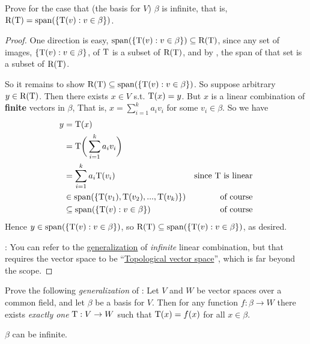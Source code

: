 \begin{exercise} \label{exercise 2.1.34}
Prove  for the case that (the basis for \(V\)) \(\beta\) is infinite,
that is, \(\mathrm{R(T)} = \operatorname{span}(\{ \mathrm{T}(v) : v \in \beta \})\).
\end{exercise}

\begin{proof}
One direction is easy, \(\operatorname{span}(\{ \mathrm{T}(v) : v \in \beta \}) \subseteq \mathrm{R(T)}\), since any set of images, \(\{ \mathrm{T}(v) : v \in \beta \}\), of \(\mathrm{T}\) is a subset of \(\mathrm{R(T)}\), and by , the span of that set is a subset of \(\mathrm{R(T)}\).

So it remains to show \(\mathrm{R(T)} \subseteq \operatorname{span}(\{ \mathrm{T}(v) : v \in \beta \})\).
So suppose arbitrary \(y \in \mathrm{R(T)}\).
Then there exists \(x \in V\) s.t. \(\mathrm{T}(x) = y\).
But \(x\) is a linear combination of \textbf{finite}\RED{*} vectors in \(\beta\),
That is, \(x = \sum_{i = 1}^k a_i v_i\) for some \(v_i \in \beta\).
So we have
\begin{align*}
    y & = \mathrm{T}(x) \\
      & = \mathrm{T}\bigg(\sum_{i = 1}^k a_i v_i\bigg) \\
      & = \sum_{i = 1}^k a_i \mathrm{T}(v_i) & \text{since \(\mathrm{T}\) is linear} \\
      & \in \operatorname{span}(\{ \mathrm{T}(v_1), \mathrm{T}(v_2), ..., \mathrm{T}(v_k) \}) & \text{of course} \\
      & \subseteq \operatorname{span}(\{ \mathrm{T}(v) : v \in \beta \}) & \text{of course}
\end{align*}
Hence \(y \in \operatorname{span}(\{ \mathrm{T}(v) : v \in \beta \})\), so \(\mathrm{R(T)} \subseteq \operatorname{span}(\{ \mathrm{T}(v) : v \in \beta \})\), as desired.

\RED{*}: You can refer to the \href{https://www.wikiwand.com/en/Linear_combination#/Generalizations}{generalization} of \emph{infinite} linear combination, but that requires the vector space to be ``\href{https://www.wikiwand.com/en/Topological_vector_space}{Topological vector space}'', which is far beyond the scope.
\end{proof}

\begin{exercise} \label{exercise 2.1.35}
Prove the following \emph{generalization} of :
Let \(V\) and \(W\) be vector spaces over a common field, and let \(\beta\) be a basis for \(V\).
Then for any function \(f: \beta \to W\) there exists \emph{exactly one} \LTRAN{} \(\mathrm{T}: V \to W\) such that \(\mathrm{T}(x) = f(x)\) for all \(x \in \beta\).

 \(\beta\) can be infinite.
\end{exercise}

